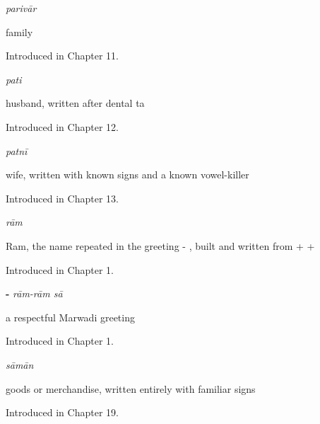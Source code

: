 \noindent\begin{minipage}[t]{\linewidth}
\raggedright
\textbf{}\enspace\emph{parivār}\par
\small family\par
\footnotesize Introduced in Chapter 11.
\end{minipage}\par\medskip

\noindent\begin{minipage}[t]{\linewidth}
\raggedright
\textbf{}\enspace\emph{pati}\par
\small husband, written after dental ta\par
\footnotesize Introduced in Chapter 12.
\end{minipage}\par\medskip

\noindent\begin{minipage}[t]{\linewidth}
\raggedright
\textbf{}\enspace\emph{patnī}\par
\small wife, written with known signs and a known vowel-killer\par
\footnotesize Introduced in Chapter 13.
\end{minipage}\par\medskip

\noindent\begin{minipage}[t]{\linewidth}
\raggedright
\textbf{}\enspace\emph{rām}\par
\small Ram, the name repeated in the greeting - , built and written from  +  + \par
\footnotesize Introduced in Chapter 1.
\end{minipage}\par\medskip

\noindent\begin{minipage}[t]{\linewidth}
\raggedright
\textbf{- }\enspace\emph{rām-rām sā}\par
\small a respectful Marwadi greeting\par
\footnotesize Introduced in Chapter 1.
\end{minipage}\par\medskip

\noindent\begin{minipage}[t]{\linewidth}
\raggedright
\textbf{}\enspace\emph{sāmān}\par
\small goods or merchandise, written entirely with familiar signs\par
\footnotesize Introduced in Chapter 19.
\end{minipage}\par\medskip

